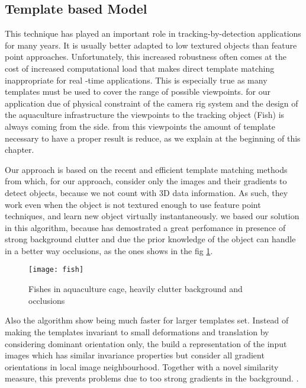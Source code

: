 \subsection{Template based Model}
\label{sec:templatedbased}
This technique has played an important role in tracking-by-detection applications for
many years. It is usually better adapted to low textured objects than feature point approaches. 
Unfortunately, this increased robustness often comes at the cost of
increased computational load that makes direct template matching inappropriate 
for real -time applications. This is especially true as many templates must be 
used to cover the range of possible viewpoints. for our application due of physical 
constraint of the camera rig system and the design of the aquaculture infrastructure
the viewpoints to the tracking object (Fish) is always coming from the side.
from this viewpoints the amount of template necessary to have a proper result is reduce, as we explain at the beginning of this chapter. 

Our approach is based on the recent and efficient template matching methods from
\citet{Hinterstoisser2011, Hinterstoisser2012} which, for our approach, consider only the images and their
gradients to detect objects, because we not count with 3D data information.
As such, they work even when the object is not textured 
enough to use feature point techniques, and learn new object virtually instantaneously.
we based our solution in this algorithm, because has demostrated a great perfomance
in presence of strong background clutter and due the prior knowledge of the object
can handle in a better way occlusions, as the ones shows in the fig \ref{fig:clutter}.


\begin{figure}[ht]
\centering
\texttt{[image: fish]}
\caption{Fishes in aquaculture cage, heavily clutter background and occlusions}
\label{fig:clutter}
\end{figure}

Also the algorithm show being much faster for larger templates set. Instead of 
making the templates invariant to small deformations and translation by considering
dominant orientation only, the build a representation of the input images which has
similar invariance properties but consider all gradient orientations in local image
neighbourhood. Together with a novel similarity measure, this prevents problems due
to too strong gradients in the background. .

